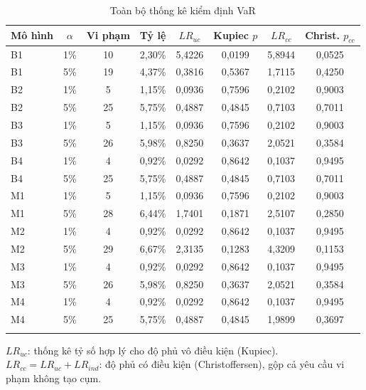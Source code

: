 \documentclass[11pt,a4paper]{article}
\begin{document}
\begin{table}[H]\centering\footnotesize
\caption{Toàn bộ thống kê kiểm định VaR}
\begin{tabularx}{\textwidth}{l c C C C C C C}
\toprule
\textbf{Mô hình} & $\alpha$ & \textbf{Vi phạm} & \textbf{Tỷ lệ} & $LR_{uc}$ & \textbf{Kupiec $p$} & $LR_{cc}$ & \textbf{Christ. $p_{cc}$} \\
\midrule
B1 & 1\% & 10 & 2{,}30\% & 5{,}4226 & 0{,}0199 & 5{,}8944 & 0{,}0525 \\
B1 & 5\% & 19 & 4{,}37\% & 0{,}3816 & 0{,}5367 & 1{,}7115 & 0{,}4250 \\
\addlinespace[1pt]
B2 & 1\% & 5 & 1{,}15\% & 0{,}0936 & 0{,}7596 & 0{,}2102 & 0{,}9003 \\
B2 & 5\% & 25 & 5{,}75\% & 0{,}4887 & 0{,}4845 & 0{,}7103 & 0{,}7011 \\
\addlinespace[1pt]
B3 & 1\% & 5 & 1{,}15\% & 0{,}0936 & 0{,}7596 & 0{,}2102 & 0{,}9003 \\
B3 & 5\% & 26 & 5{,}98\% & 0{,}8250 & 0{,}3637 & 2{,}0521 & 0{,}3584 \\
\addlinespace[1pt]
B4 & 1\% & 4 & 0{,}92\% & 0{,}0292 & 0{,}8642 & 0{,}1037 & 0{,}9495 \\
B4 & 5\% & 25 & 5{,}75\% & 0{,}4887 & 0{,}4845 & 0{,}7103 & 0{,}7011 \\
\addlinespace[1pt]
M1 & 1\% & 5 & 1{,}15\% & 0{,}0936 & 0{,}7596 & 0{,}2102 & 0{,}9003 \\
M1 & 5\% & 28 & 6{,}44\% & 1{,}7401 & 0{,}1871 & 2{,}5107 & 0{,}2850 \\
\addlinespace[1pt]
M2 & 1\% & 4 & 0{,}92\% & 0{,}0292 & 0{,}8642 & 0{,}1037 & 0{,}9495 \\
M2 & 5\% & 29 & 6{,}67\% & 2{,}3135 & 0{,}1283 & 4{,}3209 & 0{,}1153 \\
\addlinespace[1pt]
M3 & 1\% & 4 & 0{,}92\% & 0{,}0292 & 0{,}8642 & 0{,}1037 & 0{,}9495 \\
M3 & 5\% & 26 & 5{,}98\% & 0{,}8250 & 0{,}3637 & 2{,}0521 & 0{,}3584 \\
\addlinespace[1pt]
M4 & 1\% & 4 & 0{,}92\% & 0{,}0292 & 0{,}8642 & 0{,}1037 & 0{,}9495 \\
M4 & 5\% & 25 & 5{,}75\% & 0{,}4887 & 0{,}4845 & 1{,}9899 & 0{,}3697 \\
\addlinespace[1pt]
\bottomrule
\end{tabularx}
\begin{tablenotes}\footnotesize
\item $LR_{uc}$: thống kê tỷ số hợp lý cho độ phủ vô điều kiện (Kupiec). $LR_{cc} = LR_{uc} + LR_{ind}$: độ phủ có điều kiện (Christoffersen), gộp cả yêu cầu vi phạm không tạo cụm.
\end{tablenotes}
\end{table}
\end{document}
